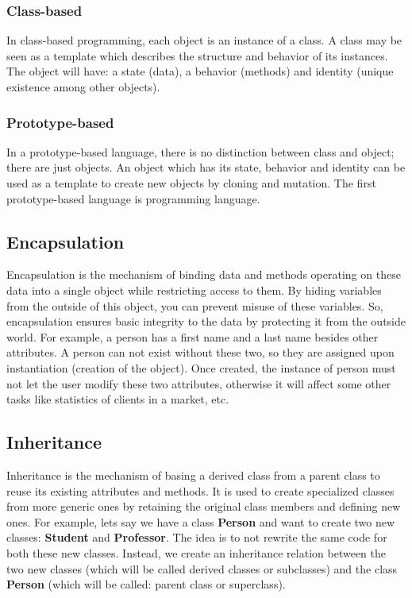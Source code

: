 \documentclass[12pt]{book}
\begin{document}
\subsubsection{Class-based}

In class-based programming, each object is an instance of a class. 
A class may be seen as a template which describes the structure and behavior of its instances.
The object will have: a state (data), a behavior (methods) and identity (unique existence among other objects).

\subsubsection{Prototype-based}

In a prototype-based language, there is no distinction between class and object; there are just objects. 
An object which has its state, behavior and identity can be used as a template to create new objects by cloning and mutation. 
The first prototype-based language is  programming language.

\subsection{Encapsulation}

Encapsulation is the mechanism of binding data and methods operating on these data into a single object while restricting access to them. 
By hiding variables from the outside of this object, you can prevent misuse of these variables.
So, encapsulation ensures basic integrity to the data by protecting it from the outside world.
For example, a person has a first name and a last name besides other attributes. 
A person can not exist without these two, so they are assigned upon instantiation (creation of the object). 
Once created, the instance of person must not let the user modify these two attributes, otherwise it will affect some other tasks like statistics of clients in a market, etc. 


\subsection{Inheritance}

Inheritance is the mechanism of basing a derived class from a parent class to reuse its existing attributes and methods. 
It is used to create specialized classes from more generic ones by retaining the original class members and defining new ones. 
For example, lets say we have a class \textbf{Person} and want to create two new classes: \textbf{Student} and \textbf{Professor}. 
The idea is to not rewrite the same code for both these new classes. 
Instead, we create an inheritance relation between the two new classes (which will be called derived classes or subclasses) and the class \textbf{Person} (which will be called: parent class or superclass). 
\end{document}
